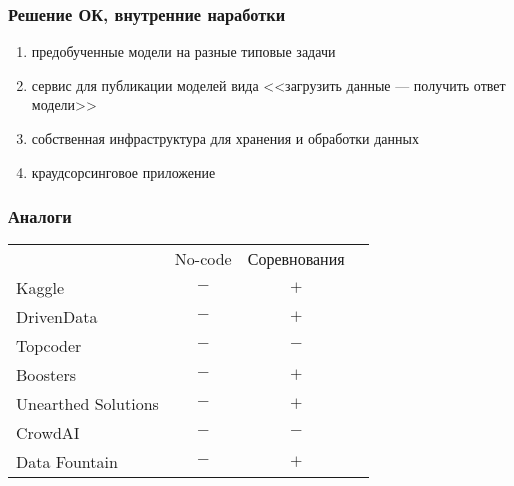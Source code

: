\begin{frame}
\frametitle{Решение ОК, внутренние наработки}
\begin{enumerate}
    \item предобученные модели на разные типовые задачи
    \item сервис для публикации моделей вида <<загрузить данные --- получить ответ модели>>
    \item собственная инфраструктура для хранения и обработки данных
    \item краудсорсинговое приложение
\end{enumerate}
\end{frame}

\begin{frame}
\frametitle{Аналоги}
\begin{center}
	\begin{tabular}{lccc}
		& No-code & Соревнования \\
		Kaggle              & $-$ & $+$ \\
		DrivenData          & $-$ & $+$ \\
		Topcoder            & $-$ & $-$ \\ %
		Boosters            & $-$ & $+$ \\
		Unearthed Solutions & $-$ & $+$ \\ %
		CrowdAI             & $-$ & $-$ \\
		Data Fountain       & $-$ & $+$ \\
	\end{tabular}
\end{center}
\end{frame}
